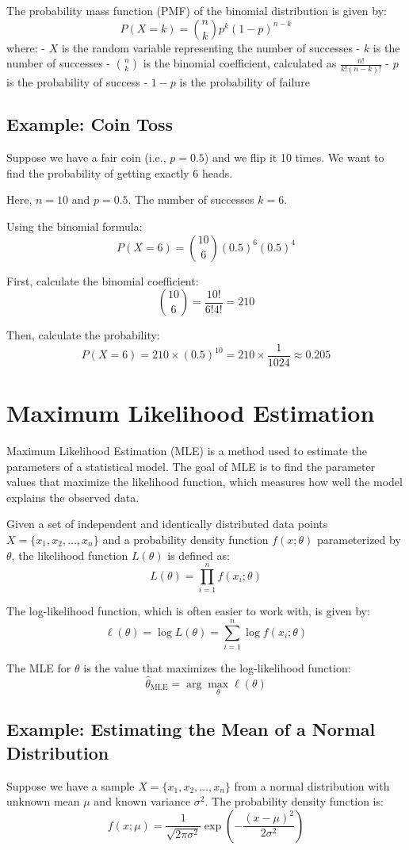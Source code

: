 \documentclass{article}
\begin{document}
The probability mass function (PMF) of the binomial distribution is given by:
\[
P(X = k) = \binom{n}{k} p^k (1 - p)^{n - k}
\]
where:
- \(X\) is the random variable representing the number of successes
- \(k\) is the number of successes
- \(\binom{n}{k}\) is the binomial coefficient, calculated as \(\frac{n!}{k!(n - k)!}\)
- \(p\) is the probability of success
- \(1 - p\) is the probability of failure

\subsection{Example: Coin Toss}
Suppose we have a fair coin (i.e., \(p = 0.5\)) and we flip it 10 times. We want to find the probability of getting exactly 6 heads.

Here, \(n = 10\) and \(p = 0.5\). The number of successes \(k = 6\).

Using the binomial formula:
\[
P(X = 6) = \binom{10}{6} (0.5)^6 (0.5)^{4}
\]

First, calculate the binomial coefficient:
\[
\binom{10}{6} = \frac{10!}{6!4!} = 210
\]

Then, calculate the probability:
\[
P(X = 6) = 210 \times (0.5)^{10} = 210 \times \frac{1}{1024} \approx 0.205
\]

\section{Maximum Likelihood Estimation}
Maximum Likelihood Estimation (MLE) is a method used to estimate the parameters of a statistical model. The goal of MLE is to find the parameter values that maximize the likelihood function, which measures how well the model explains the observed data.

Given a set of independent and identically distributed data points \(X = \{x_1, x_2, \ldots, x_n\}\) and a probability density function \(f(x; \theta)\) parameterized by \(\theta\), the likelihood function \(L(\theta)\) is defined as:
\[
L(\theta) = \prod_{i=1}^{n} f(x_i; \theta)
\]

The log-likelihood function, which is often easier to work with, is given by:
\[
\ell(\theta) = \log L(\theta) = \sum_{i=1}^{n} \log f(x_i; \theta)
\]

The MLE for \(\theta\) is the value that maximizes the log-likelihood function:
\[
\hat{\theta}_{\text{MLE}} = \arg \max_{\theta} \ell(\theta)
\]

\subsection{Example: Estimating the Mean of a Normal Distribution}
Suppose we have a sample \(X = \{x_1, x_2, \ldots, x_n\}\) from a normal distribution with unknown mean \(\mu\) and known variance \(\sigma^2\). The probability density function is:
\[
f(x; \mu) = \frac{1}{\sqrt{2\pi\sigma^2}} \exp\left(-\frac{(x - \mu)^2}{2\sigma^2}\right)
\]
\end{document}
